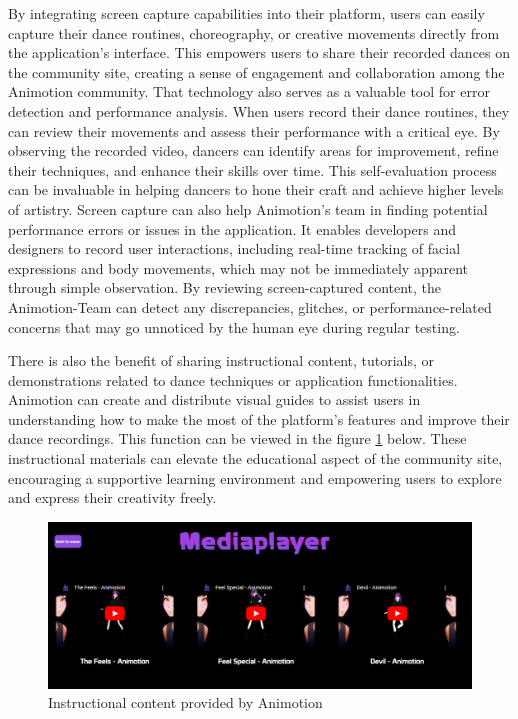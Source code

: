By integrating screen capture capabilities into their platform, users can easily capture their dance routines, choreography, or creative 
movements directly from the application's interface. This empowers users to share their recorded dances on the community site, creating a 
sense of engagement and collaboration among the Animotion community. That technology also serves as a valuable tool for error 
detection and performance analysis. When users record their dance routines, they can review their movements and assess their 
performance with a critical eye. By observing the recorded video, dancers can identify areas for improvement, refine their 
techniques, and enhance their skills over time. This self-evaluation process can be invaluable in helping dancers to 
hone their craft and achieve higher levels of artistry. Screen capture can also help Animotion's team in finding potential 
performance errors or issues in the application. It enables developers and designers to record user interactions, including real-time 
tracking of facial expressions and body movements, which may not be immediately apparent through simple observation. 
By reviewing screen-captured content, the Animotion-Team can detect any discrepancies, glitches, or performance-related 
concerns that may go unnoticed by the human eye during regular testing.

There is also the benefit of sharing instructional content, tutorials, or demonstrations related to dance techniques or 
application functionalities. Animotion can create and distribute visual guides to assist users in understanding how to make the most of the 
platform's features and improve their dance recordings. This function can be viewed in the figure \ref{fig:examplevids} below. These instructional materials can elevate 
the educational aspect of the community site, encouraging a supportive learning environment and empowering users to explore and express their creativity freely.

\begin{figure}[htb]
  \centering
  \includegraphics[width=1\textwidth]{pics/exampleVids.png}
  \caption{Instructional content provided by Animotion}
  \label{fig:examplevids}
\end{figure}

